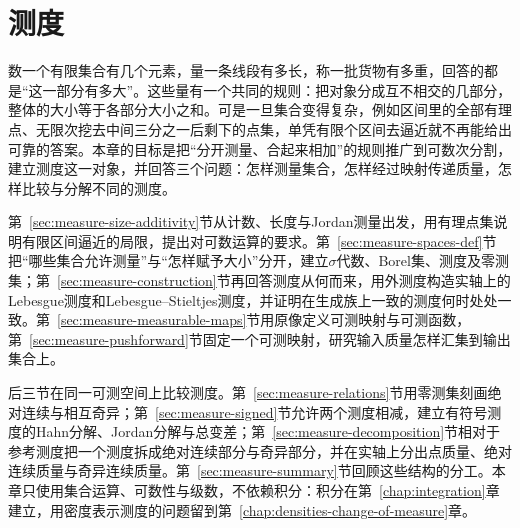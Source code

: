 \chapter{测度}
\label{chap:measure-spaces}
\label{chap:measures}

数一个有限集合有几个元素，量一条线段有多长，称一批货物有多重，回答的都是“这一部分有多大”。这些量有一个共同的规则：把对象分成互不相交的几部分，整体的大小等于各部分大小之和。可是一旦集合变得复杂，例如区间里的全部有理点、无限次挖去中间三分之一后剩下的点集，单凭有限个区间去逼近就不再能给出可靠的答案。本章的目标是把“分开测量、合起来相加”的规则推广到可数次分割，建立测度这一对象，并回答三个问题：怎样测量集合，怎样经过映射传递质量，怎样比较与分解不同的测度。

第~\ref{sec:measure-size-additivity}节从计数、长度与Jordan测量出发，用有理点集说明有限区间逼近的局限，提出对可数运算的要求。第~\ref{sec:measure-spaces-def}节把“哪些集合允许测量”与“怎样赋予大小”分开，建立$\sigma$代数、Borel集、测度及零测集；第~\ref{sec:measure-construction}节再回答测度从何而来，用外测度构造实轴上的Lebesgue测度和Lebesgue--Stieltjes测度，并证明在生成族上一致的测度何时处处一致。第~\ref{sec:measure-measurable-maps}节用原像定义可测映射与可测函数，第~\ref{sec:measure-pushforward}节固定一个可测映射，研究输入质量怎样汇集到输出集合上。

后三节在同一可测空间上比较测度。第~\ref{sec:measure-relations}节用零测集刻画绝对连续与相互奇异；第~\ref{sec:measure-signed}节允许两个测度相减，建立有符号测度的Hahn分解、Jordan分解与总变差；第~\ref{sec:measure-decomposition}节相对于参考测度把一个测度拆成绝对连续部分与奇异部分，并在实轴上分出点质量、绝对连续质量与奇异连续质量。第~\ref{sec:measure-summary}节回顾这些结构的分工。本章只使用集合运算、可数性与级数，不依赖积分：积分在第~\ref{chap:integration}章建立，用密度表示测度的问题留到第~\ref{chap:densities-change-of-measure}章。










